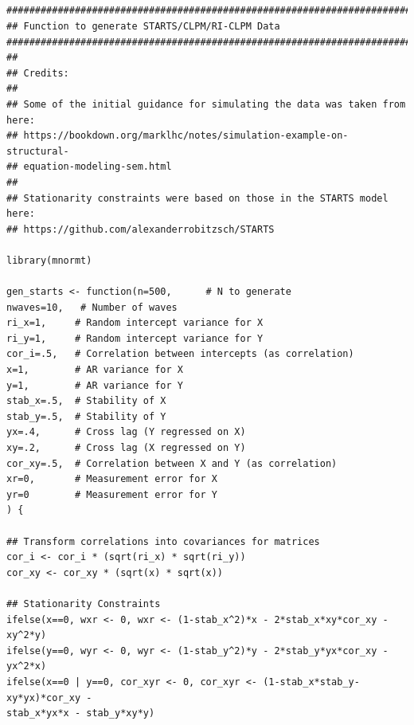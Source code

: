\documentclass[
  english,
  man,floatsintext]{apa6}
\begin{document}
\begin{appendix}
\section{}
\begin{verbatim}
################################################################################
## Function to generate STARTS/CLPM/RI-CLPM Data
################################################################################
##
## Credits:
##
## Some of the initial guidance for simulating the data was taken from here:
## https://bookdown.org/marklhc/notes/simulation-example-on-structural-
## equation-modeling-sem.html
##
## Stationarity constraints were based on those in the STARTS model here:
## https://github.com/alexanderrobitzsch/STARTS

library(mnormt)

gen_starts <- function(n=500,      # N to generate
nwaves=10,   # Number of waves
ri_x=1,     # Random intercept variance for X
ri_y=1,     # Random intercept variance for Y
cor_i=.5,   # Correlation between intercepts (as correlation)
x=1,        # AR variance for X
y=1,        # AR variance for Y
stab_x=.5,  # Stability of X
stab_y=.5,  # Stability of Y
yx=.4,      # Cross lag (Y regressed on X)
xy=.2,      # Cross lag (X regressed on Y)
cor_xy=.5,  # Correlation between X and Y (as correlation)
xr=0,       # Measurement error for X
yr=0        # Measurement error for Y
) {

## Transform correlations into covariances for matrices
cor_i <- cor_i * (sqrt(ri_x) * sqrt(ri_y))
cor_xy <- cor_xy * (sqrt(x) * sqrt(x))

## Stationarity Constraints
ifelse(x==0, wxr <- 0, wxr <- (1-stab_x^2)*x - 2*stab_x*xy*cor_xy - xy^2*y)
ifelse(y==0, wyr <- 0, wyr <- (1-stab_y^2)*y - 2*stab_y*yx*cor_xy - yx^2*x)
ifelse(x==0 | y==0, cor_xyr <- 0, cor_xyr <- (1-stab_x*stab_y-xy*yx)*cor_xy - 
stab_x*yx*x - stab_y*xy*y)



\end{verbatim}
\end{appendix}
\end{document}
